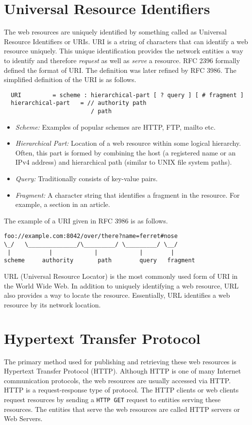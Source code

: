 \section{Universal Resource Identifiers}
The web resources are uniquely identified by something called as
Universal Resource Identifiers or URIs. URI is a string of characters
that can identify a web resource uniquely. This unique identification
provides the network entities a way to identify and therefore
\emph{request} as well as \emph{serve} a resource. RFC 2396 formally
defined the format of URI. The definition was later refined by RFC
3986. The simplified definition of the URI is as follows.
\begin{center}
  \begin{verbatim}
  URI         = scheme : hierarchical-part [ ? query ] [ # fragment ]
  hierarchical-part   = // authority path
                         / path
\end{verbatim}
\end{center}
\begin{itemize}
  \item{\emph{Scheme:}} Examples of popular schemes are HTTP, FTP,
    mailto etc.
  \item{\emph{Hierarchical Part:}} Location of a web resource within
    some logical hierarchy. Often, this part is formed by combining
    the host (a registered name or an IPv4 address) and hierarchical
    path (similar to UNIX file system paths).
  \item{\emph{Query:}} Traditionally consists of key-value pairs.
  \item{\emph{Fragment:}} A character string that identifies a
    fragment in the resource. For example, a section in an article.
\end{itemize}
The example of a URI given in RFC 3986 is as follows.
\begin{verbatim}
foo://example.com:8042/over/there?name=ferret#nose
\_/   \______________/\_________/ \_________/ \__/
 |           |            |            |        |
scheme     authority       path        query   fragment
\end{verbatim}
URL (Universal Resource Locator) is the most commonly used form of URI
in the World Wide Web. In addition to uniquely identifying a web
resource, URL also provides a way to locate the resource. Essentially,
URL identifies a web resource by its network location.
\section{Hypertext Transfer Protocol}
The primary method used for publishing and retrieving these web
resources is Hypertext Transfer Protocol (HTTP). Although HTTP is one
of many Internet communication protocols, the web resources are
usually accessed via HTTP. HTTP is a request-response type of
protocol. The HTTP clients or web clients request resources by sending
a \texttt{HTTP GET} request to entities serving these resources. The
entities that serve the web resources are called HTTP servers or Web
Servers.

